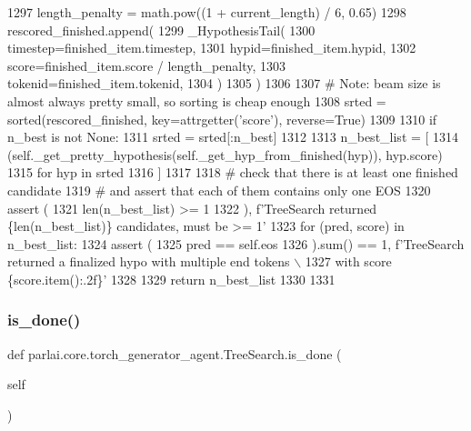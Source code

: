 \begin{DoxyCode}
1297             length\_penalty = math.pow((1 + current\_length) / 6, 0.65)
1298             rescored\_finished.append(
1299                 \_HypothesisTail(
1300                     timestep=finished\_item.timestep,
1301                     hypid=finished\_item.hypid,
1302                     score=finished\_item.score / length\_penalty,
1303                     tokenid=finished\_item.tokenid,
1304                 )
1305             )
1306 
1307         \textcolor{comment}{# Note: beam size is almost always pretty small, so sorting is cheap enough}
1308         srted = sorted(rescored\_finished, key=attrgetter(\textcolor{stringliteral}{'score'}), reverse=\textcolor{keyword}{True})
1309 
1310         \textcolor{keywordflow}{if} n\_best \textcolor{keywordflow}{is} \textcolor{keywordflow}{not} \textcolor{keywordtype}{None}:
1311             srted = srted[:n\_best]
1312 
1313         n\_best\_list = [
1314             (self.\_get\_pretty\_hypothesis(self.\_get\_hyp\_from\_finished(hyp)), hyp.score)
1315             \textcolor{keywordflow}{for} hyp \textcolor{keywordflow}{in} srted
1316         ]
1317 
1318         \textcolor{comment}{# check that there is at least one finished candidate}
1319         \textcolor{comment}{# and assert that each of them contains only one EOS}
1320         \textcolor{keyword}{assert} (
1321             len(n\_best\_list) >= 1
1322         ), f\textcolor{stringliteral}{'TreeSearch returned \{len(n\_best\_list)\} candidates, must be >= 1'}
1323         \textcolor{keywordflow}{for} (pred, score) \textcolor{keywordflow}{in} n\_best\_list:
1324             \textcolor{keyword}{assert} (
1325                 pred == self.eos
1326             ).sum() == 1, f\textcolor{stringliteral}{'TreeSearch returned a finalized hypo with multiple end tokens \(\backslash\)}
1327 \textcolor{stringliteral}{            with score \{score.item():.2f\}'}
1328 
1329         \textcolor{keywordflow}{return} n\_best\_list
1330 
1331 
\end{DoxyCode}
\mbox{\label{classparlai_1_1core_1_1torch__generator__agent_1_1TreeSearch_a35a3cbfe2df2d02bb46f7e492657afa5}} 
\subsubsection{\texorpdfstring{is\+\_\+done()}{is\_done()}}
{\footnotesize\ttfamily def parlai.\+core.\+torch\+\_\+generator\+\_\+agent.\+Tree\+Search.\+is\+\_\+done (\begin{DoxyParamCaption}\item[{}]{self }\end{DoxyParamCaption})}

